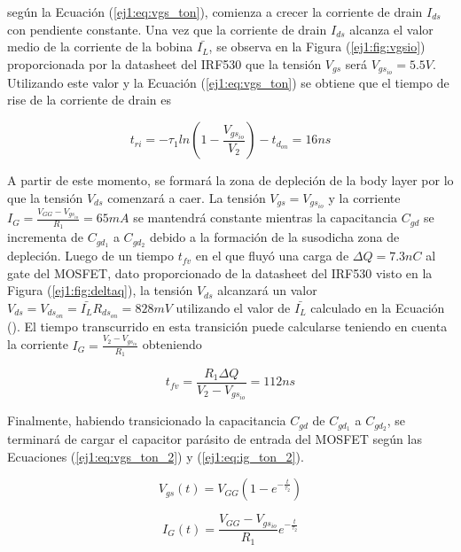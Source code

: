 según la Ecuación (\ref{ej1:eq:vgs_ton}), comienza a crecer la corriente de drain $I_{ds}$ con pendiente constante. Una vez que la corriente de drain $I_{ds}$ alcanza el valor medio de la corriente de la bobina $\bar{I_L}$, se observa en la Figura (\ref{ej1:fig:vgsio}) proporcionada por la datasheet del IRF530 que la tensión $V_{gs}$ será $V_{gs_{io}} = 5.5V$. Utilizando este valor y la Ecuación (\ref{ej1:eq:vgs_ton}) se obtiene que el tiempo de rise de la corriente de drain es

\begin{equation}
	t_{ri} = -\tau_1 ln\left( 1-\frac{V_{gs_{io}}}{V_2} \right) -t_{d_{on}} = 16ns
\label{ej1:eq:trise}
\end{equation}

A partir de este momento, se formará la zona de depleción de la body layer por lo que la tensión $V_{ds}$ comenzará a caer. La tensión $V_{gs} = V_{gs_{io}}$ y la corriente $I_G = \frac{V_{GG}-V_{gs_{io}}}{R_1} = 65mA$ se mantendrá constante mientras la capacitancia $C_{gd}$ se incrementa de $C_{gd_1}$ a $C_{gd_2}$ debido a la formación de la susodicha zona de depleción. Luego de un tiempo $t_{fv}$ en el que fluyó una carga de $\Delta Q = 7.3nC$ al gate del MOSFET, dato proporcionado de la datasheet del IRF530 visto en la Figura (\ref{ej1:fig:deltaq}), la tensión $V_{ds}$ alcanzará un valor $V_{ds} = V_{ds_{on}} = \bar{I_L} R_{ds_{on}} = 828mV$ utilizando el valor de $\bar{I_L}$ calculado en la Ecuación (). El tiempo transcurrido en esta transición puede calcularse teniendo en cuenta la corriente $I_G = \frac{V_2 - V_{gs_{io}}}{R_1}$ obteniendo

\begin{equation}
	t_{fv} = \frac{R_1 \Delta Q}{V_2 - V_{gs_{io}}} = 112ns
	\label{ej1:eq:tfv}
\end{equation}

Finalmente, habiendo transicionado la capacitancia $C_{gd}$ de $C_{gd_1}$ a $C_{gd_2}$, se terminará de cargar el capacitor parásito de entrada del MOSFET según las Ecuaciones (\ref{ej1:eq:vgs_ton_2}) y (\ref{ej1:eq:ig_ton_2}).

\begin{equation}
V_{gs}(t) = V_{GG}(1-e^{-\frac{t}{\tau_2}})
\label{ej1:eq:vgs_ton_2}
\end{equation}

\begin{equation}
I_{G}(t) =  \frac{V_{GG}-V_{gs_{io}}}{R_1}e^{-\frac{t}{\tau_2}}
\label{ej1:eq:ig_ton_2}
\end{equation}

